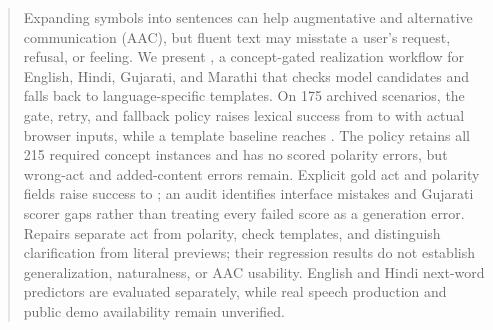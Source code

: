 \begin{abstract}
Expanding symbols into sentences can help augmentative and alternative communication (AAC), but fluent text may misstate a user's request, refusal, or feeling.
We present \sys{}, a concept-gated realization workflow for English, Hindi, Gujarati, and Marathi that checks model candidates and falls back to language-specific templates.
On 175 archived scenarios, the gate, retry, and fallback policy raises lexical success from \WebCascade{} to \WebPolicy{} with actual browser inputs, while a template baseline reaches \WebTemplate{}.
The policy retains all 215 required concept instances and has no scored polarity errors, but wrong-act and added-content errors remain.
Explicit gold act and polarity fields raise success to \GoldPolicy{}; an audit identifies interface mistakes and Gujarati scorer gaps rather than treating every failed score as a generation error.
Repairs separate act from polarity, check templates, and distinguish clarification from literal previews; their regression results do not establish generalization, naturalness, or AAC usability.
English and Hindi next-word predictors are evaluated separately, while real speech production and public demo availability remain unverified.
\end{abstract}
